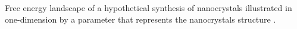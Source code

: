 \label{fig:energy-landscape} Free energy landscape of a hypothetical synthesis of nanocrystals illustrated in one-dimension by a parameter that represents the nanocrystals structure \cite{Xia_2015}.
  
  
  
  
  
  